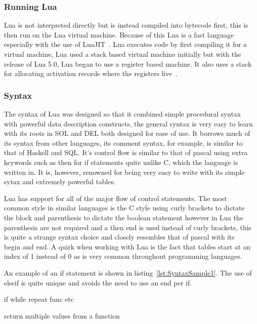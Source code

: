 \documentclass[11pt,a4paper,titlepage]{article}
\begin{document}
\subsubsection{Running Lua}
	Lua is not interpreted directly but is instead compiled into bytecode first, this is then run on the Lua virtual machine. Because of this Lua is a fast language especially with the use of LuaJIT~\cite{LuaJIT}. Lua executes code by first compiling it for a virtual machine, Lua used a stack based virtual machine initially but with the release of Lua 5.0, Lua began to use a register based machine. It also uses a stack for allocating activation records where the registers live~\cite{IerusalimschyImplementation}.

\subsubsection{Syntax}
	The syntax of Lua was designed so that it combined simple procedural syntax with powerful data description constructs, the general syntax is very easy to learn with its roots in SOL and DEL both designed for ease of use. It borrows much of its syntax from other languages, its comment syntax, for example, is similar to that of Haskell and SQL. It's control flow is similar to that of pascal using extra keywords such as then for if statements quite unlike C, which the language is written in. It is, however, renowned for being very easy to write with its simple sytax and extremely powerful tables.

	Lua has support for all of the major flow of control statements. The most common style in similar languages is the C style using curly brackets to dictate the block and parenthesis to dictate the boolean statement however in Lua the parenthesis are not required and a then end is used instead of curly brackets, this is quite a strange syntax choice and closely resembles that of pascal with its begin and end. A quirk when working with Lua is the fact that tables start at an index of 1 instead of 0 as is very common throughout programming languages.

	An example of an if statement is shown in listing~\ref{lst:SyntaxSample1}. The use of elseif is quite unique and avoids the need to use an end per if.

	

	if while repeat func etc

	return multiple values from a function
\end{document}
